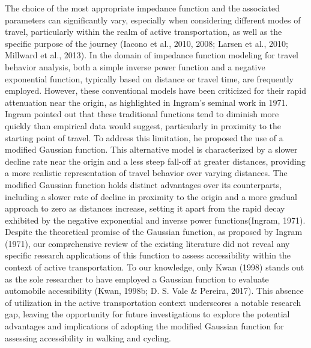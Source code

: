 \documentclass[
11pt, %
oneside, %
english, %
singlespacing, %
]{macthesis} %
\begin{document}
The choice of the most appropriate impedance function and the associated parameters can significantly vary, especially when considering different modes of travel, particularly within the realm of active transportation, as well as the specific purpose of the journey (Iacono et al., 2010, 2008; Larsen et al., 2010; Millward et al., 2013). In the domain of impedance function modeling for travel behavior analysis, both a simple inverse power function and a negative exponential function, typically based on distance or travel time, are frequently employed. However, these conventional models have been criticized for their rapid attenuation near the origin, as highlighted in Ingram's seminal work in 1971. Ingram pointed out that these traditional functions tend to diminish more quickly than empirical data would suggest, particularly in proximity to the starting point of travel. To address this limitation, he proposed the use of a modified Gaussian function. This alternative model is characterized by a slower decline rate near the origin and a less steep fall-off at greater distances, providing a more realistic representation of travel behavior over varying distances. The modified Gaussian function holds distinct advantages over its counterparts, including a slower rate of decline in proximity to the origin and a more gradual approach to zero as distances increase, setting it apart from the rapid decay exhibited by the negative exponential and inverse power functions(Ingram, 1971). Despite the theoretical promise of the Gaussian function, as proposed by Ingram (1971), our comprehensive review of the existing literature did not reveal any specific research applications of this function to assess accessibility within the context of active transportation. To our knowledge, only Kwan (1998) stands out as the sole researcher to have employed a Gaussian function to evaluate automobile accessibility (Kwan, 1998b; D. S. Vale \& Pereira, 2017). This absence of utilization in the active transportation context underscores a notable research gap, leaving the opportunity for future investigations to explore the potential advantages and implications of adopting the modified Gaussian function for assessing accessibility in walking and cycling.
\end{document}
